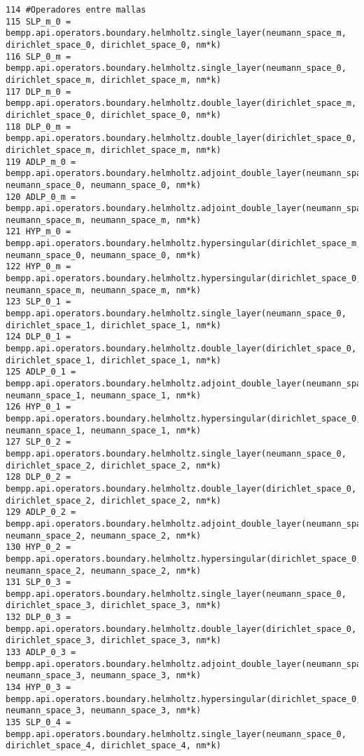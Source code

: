 \documentclass[12pt,letterpaper]{report}
\numberwithin{equation}{section}
\begin{document}
\begin{lstlisting}
114 #Operadores entre mallas
115 SLP_m_0 = bempp.api.operators.boundary.helmholtz.single_layer(neumann_space_m, dirichlet_space_0, dirichlet_space_0, nm*k)
116 SLP_0_m = bempp.api.operators.boundary.helmholtz.single_layer(neumann_space_0, dirichlet_space_m, dirichlet_space_m, nm*k)
117 DLP_m_0 = bempp.api.operators.boundary.helmholtz.double_layer(dirichlet_space_m, dirichlet_space_0, dirichlet_space_0, nm*k)
118 DLP_0_m = bempp.api.operators.boundary.helmholtz.double_layer(dirichlet_space_0, dirichlet_space_m, dirichlet_space_m, nm*k)
119 ADLP_m_0 = bempp.api.operators.boundary.helmholtz.adjoint_double_layer(neumann_space_m, neumann_space_0, neumann_space_0, nm*k)
120 ADLP_0_m = bempp.api.operators.boundary.helmholtz.adjoint_double_layer(neumann_space_0, neumann_space_m, neumann_space_m, nm*k)
121 HYP_m_0 = bempp.api.operators.boundary.helmholtz.hypersingular(dirichlet_space_m, neumann_space_0, neumann_space_0, nm*k)
122 HYP_0_m = bempp.api.operators.boundary.helmholtz.hypersingular(dirichlet_space_0, neumann_space_m, neumann_space_m, nm*k)
123 SLP_0_1 = bempp.api.operators.boundary.helmholtz.single_layer(neumann_space_0, dirichlet_space_1, dirichlet_space_1, nm*k)
124 DLP_0_1 = bempp.api.operators.boundary.helmholtz.double_layer(dirichlet_space_0, dirichlet_space_1, dirichlet_space_1, nm*k)
125 ADLP_0_1 = bempp.api.operators.boundary.helmholtz.adjoint_double_layer(neumann_space_0, neumann_space_1, neumann_space_1, nm*k)
126 HYP_0_1 = bempp.api.operators.boundary.helmholtz.hypersingular(dirichlet_space_0, neumann_space_1, neumann_space_1, nm*k)
127 SLP_0_2 = bempp.api.operators.boundary.helmholtz.single_layer(neumann_space_0, dirichlet_space_2, dirichlet_space_2, nm*k)
128 DLP_0_2 = bempp.api.operators.boundary.helmholtz.double_layer(dirichlet_space_0, dirichlet_space_2, dirichlet_space_2, nm*k)
129 ADLP_0_2 = bempp.api.operators.boundary.helmholtz.adjoint_double_layer(neumann_space_0, neumann_space_2, neumann_space_2, nm*k)
130 HYP_0_2 = bempp.api.operators.boundary.helmholtz.hypersingular(dirichlet_space_0, neumann_space_2, neumann_space_2, nm*k)
131 SLP_0_3 = bempp.api.operators.boundary.helmholtz.single_layer(neumann_space_0, dirichlet_space_3, dirichlet_space_3, nm*k)
132 DLP_0_3 = bempp.api.operators.boundary.helmholtz.double_layer(dirichlet_space_0, dirichlet_space_3, dirichlet_space_3, nm*k)
133 ADLP_0_3 = bempp.api.operators.boundary.helmholtz.adjoint_double_layer(neumann_space_0, neumann_space_3, neumann_space_3, nm*k)
134 HYP_0_3 = bempp.api.operators.boundary.helmholtz.hypersingular(dirichlet_space_0, neumann_space_3, neumann_space_3, nm*k)
135 SLP_0_4 = bempp.api.operators.boundary.helmholtz.single_layer(neumann_space_0, dirichlet_space_4, dirichlet_space_4, nm*k)

\end{lstlisting}
\end{document}
